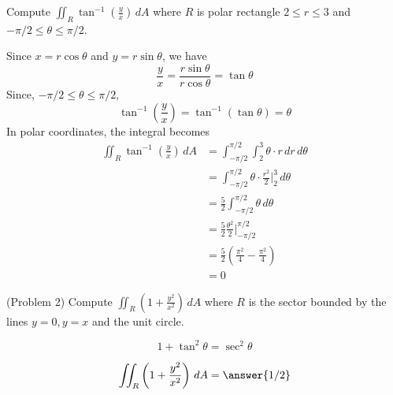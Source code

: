 \documentclass[handout]{ximera}
\begin{document}
\begin{example}[Example 2]
Compute $\iint_R \tan^{-1}\left(\frac{y}{x}\right) \, dA$ where $R$ is polar rectangle $ 2 \leq r \leq 3$ and $-\pi/2 \leq \theta \leq \pi/2$.\\

\begin{image}
\end{image}

Since $x = r\cos \theta$ and $y = r\sin \theta$, we have
\[
\frac{y}{x} = \frac{r\sin \theta}{r\cos\theta} = \tan \theta
\]
Since, $-\pi/2 \leq \theta \leq \pi/2$,
\[
\tan^{-1} \left(\frac{y}{x}\right) = \tan^{-1} (\tan \theta) = \theta
\]
In polar coordinates, the integral becomes
\begin{align*}
\iint_R \tan^{-1}\left(\frac{y}{x}\right) \, dA & = \int_{-\pi/2}^{\pi/2} \int_2^3 \theta \cdot r \, dr \, d\theta\\
                                                & = \int_{-\pi/2}^{\pi/2}  \theta \cdot \frac{r^2}{2}\bigg|_2^3 \, d\theta\\
                                                & = \frac52 \int_{-\pi/2}^{\pi/2}  \theta \, d\theta\\
                                                &= \frac52 \frac{\theta^2}{2} \bigg|_{-\pi/2}^{\pi/2}\\
                                                &= \frac52 \left(\frac{\pi^2}{4} - \frac{\pi^2}{4}\right)\\
                                                &= 0
\end{align*}  

\end{example}

\begin{problem}(Problem 2)
Compute $\iint_R \left(1 + \frac{y^2}{x^2}\right) \, dA$ where $R$ is the sector bounded by the lines $y = 0, y = x$ and the unit circle.\\
\begin{hint}
\[
1 + \tan^2 \theta = \sec^2 \theta
\]
\end{hint}
\[
\iint_R \left(1 + \frac{y^2}{x^2}\right) \, dA = \answer{1/2}
\]
\end{problem}
\end{document}
